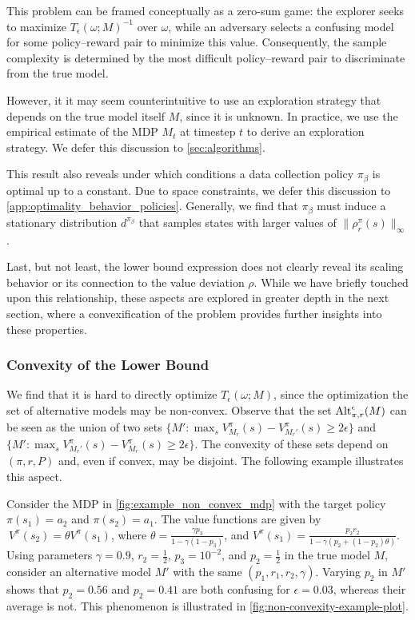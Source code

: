 This problem can be framed conceptually as a zero-sum game:  the explorer seeks to maximize $T_\epsilon(\omega; M)^{-1}$ over $\omega$, while an adversary selects a confusing model for some policy–reward pair to minimize this value. Consequently, the sample complexity is determined by the most difficult policy–reward pair to discriminate from the true model.

 
 However, it it may seem counterintuitive to use an exploration strategy that depends on the true model itself $M$, since it is unknown. In practice,  we use the empirical estimate of the MDP $M_t$ at timestep $t$ to derive an exploration strategy. We defer this discussion to \cref{sec:algorithms}. 

This result also reveals under which conditions a data collection policy \(\pi_\beta\) is optimal  up to a constant. Due to space constraints, we defer this discussion to \cref{app:optimality_behavior_policies}. Generally, we find that \(\pi_\beta\) must induce a stationary distribution \(d^{\pi_\beta}\) that  samples states with larger values of  \(\|\rho_r^\pi(s)\|_\infty\).



Last, but not least, the lower bound expression does not clearly reveal its scaling behavior or its connection to the value deviation \(\rho\). While we have briefly touched upon this relationship, these aspects are explored in greater depth in the next section, where a convexification of the problem provides further insights into these properties. 





\subsubsection{Convexity of the Lower Bound}
We find that it is hard to directly optimize $T_\epsilon(\omega;M)$, since the optimization  the set of alternative models may be non-convex.
Observe  that  the set ${\rm Alt}_{\pi,r}^\epsilon(M)$ can be seen as the union of two sets $\{M': \max_s V_{M_r}^\pi(s) - V_{M_r'}^\pi(s) \geq 2\epsilon\}$ and  $\{M': \max_s  V_{M_r'}^\pi(s) - V_{M_r}^\pi(s) \geq 2\epsilon\}$. The convexity of these sets depend on $(\pi, r, P)$ and, even if convex, may be disjoint. The following example illustrates this aspect.

\begin{example}\label{example:non_convexity}
Consider the MDP in \cref{fig:example_non_convex_mdp} with the target policy \(\pi(s_1) = a_2\) and \(\pi(s_2) = a_1\). The value functions are given by
$\
V^\pi(s_2) = \theta V^\pi(s_1)$, where $\theta = \frac{\gamma p_3}{1 - \gamma(1 - p_3)}$, 
and
$
V^\pi(s_1) = \frac{p_2 r_2}{1 - \gamma(p_2 + (1 - p_2)\theta)}.
$
Using parameters \(\gamma = 0.9\), \(r_2 = \frac{1}{2}\), \(p_3 = 10^{-2}\), and \(p_2 = \frac{1}{2}\) in the true model \(M\), consider an alternative model \(M'\) with the same \((p_1, r_1, r_2, \gamma)\). Varying \(p_2\) in \(M'\) shows that \(p_2 = 0.56\) and \(p_2 = 0.41\) are both confusing for \(\epsilon = 0.03\), whereas their average is not. This phenomenon is illustrated in \cref{fig:non-convexity-example-plot}.
\end{example}

